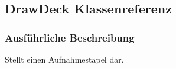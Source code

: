 \hypertarget{a00010}{\subsection{Draw\-Deck Klassenreferenz}
\label{a00010}
}


\subsubsection{Ausführliche Beschreibung}
Stellt einen Aufnahmestapel dar. 